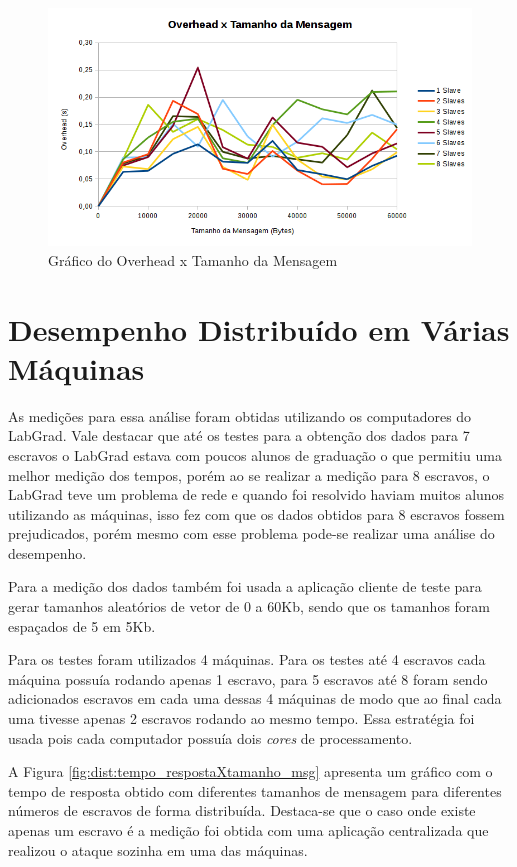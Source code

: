 \documentclass[
	12pt,				%
    oneside,			%
	a4paper,			%
	english,			%
	brazil,				%
	]{abntex2}
\begin{document}
\begin{figure}[!htb]
\centering
\includegraphics[scale=0.65]{figuras/overhead_centralizado.png}
\caption{Gráfico do Overhead x Tamanho da Mensagem}
\label{fig:cent:overheadXtamanho_msg}
\end{figure}


\section{Desempenho Distribuído em Várias Máquinas}

As medições para essa análise foram obtidas utilizando os computadores do LabGrad. Vale destacar que até os testes para a 
obtenção dos dados para 7 escravos o LabGrad estava com poucos alunos de graduação o que permitiu uma melhor medição dos tempos, porém ao se realizar a medição para 8 escravos, o LabGrad teve um problema de rede e quando foi resolvido haviam muitos alunos utilizando as máquinas, isso fez com que os dados obtidos para 8 escravos fossem prejudicados, porém mesmo com esse problema pode-se realizar uma análise do desempenho.

Para a medição dos dados também foi usada a aplicação cliente de teste para gerar tamanhos aleatórios de vetor de 0 a 60Kb,
sendo que os tamanhos foram espaçados de 5 em 5Kb.

Para os testes foram utilizados 4 máquinas. Para os testes até 4 escravos cada máquina possuía rodando apenas 1 escravo, para 5 escravos até 8 foram sendo adicionados escravos em cada uma dessas 4 máquinas de modo que ao final cada uma tivesse apenas 2
escravos rodando ao mesmo tempo. Essa estratégia foi usada pois cada computador possuía dois \textit{cores} de processamento.

A Figura \ref{fig:dist:tempo_respostaXtamanho_msg} apresenta um gráfico com o tempo de resposta obtido com diferentes tamanhos de mensagem para diferentes números de escravos de forma distribuída. Destaca-se que o caso onde existe apenas um escravo é a medição foi obtida com uma aplicação centralizada que realizou o ataque sozinha em uma das máquinas.
\end{document}

